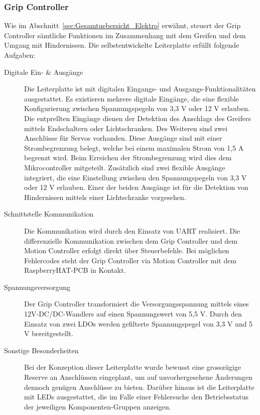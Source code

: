 \documentclass[main.tex]{subfiles} %
\begin{document}

\subsubsection{Grip Controller}
Wie im Abschnitt~\ref{sec:Gesamtuebersicht_Elektro} erwähnt, steuert der Grip
Controller sämtliche Funktionen im Zusammenhang mit dem Greifen und dem Umgang
mit Hindernissen. Die selbstentwickelte Leiterplatte erfüllt folgende Aufgaben:

\begin{description}
      \item[Digitale Ein- \& Ausgänge] Die Leiterplatte ist mit digitalen Eingangs- und
            Ausgangs-Funktionalitäten ausgestattet. Es existieren mehrere digitale
            Eingänge, die eine flexible Konfigurierung zwischen Spannungspegeln von 3,3 V
            oder 12 V erlauben. Die entprellten Eingänge dienen der Detektion des Anschlags
            des Greifers mittels Endschaltern oder Lichtschranken. Des Weiteren sind zwei
            Anschlüsse für Servos vorhanden. Diese Ausgänge sind mit einer Strombegrenzung
            belegt, welche bei einem maximalen Strom von 1,5 A begrenzt wird. Beim
            Erreichen der Strombegrenzung wird dies dem Mikrocontroller mitgeteilt.
            Zusätzlich sind zwei flexible Ausgänge integriert, die eine Einstellung
            zwischen den Spannungspegeln von 3,3 V oder 12 V erlauben. Einer der beiden
            Ausgänge ist für die Detektion von Hindernissen mittels einer Lichtschranke
            vorgesehen.

      \item[Schnittstelle Kommunikation] Die Kommunikation wird durch den Einsatz von UART
            realisiert. Die differenzielle Kommunikation zwischen dem Grip Controller und
            dem Motion Controller erfolgt direkt über Steuerbefehle. Bei möglichen
            Fehlercodes steht der Grip Controller via Motion Controller mit dem
            RaspberryHAT-PCB in Kontakt.

      \item[Spannungsversorgung] Der Grip Controller transformiert die Versorgungsspannung
            mittels eines 12V-DC/DC-Wandlers auf einen Spannungswert von 5,5 V. Durch den
            Einsatz von zwei LDOs werden gefilterte Spannungspegel von 3,3 V und 5 V
            bereitgestellt.

      \item[Sonstige Besonderheiten] Bei der Konzeption dieser Leiterplatte wurde bewusst
            eine grosszügige Reserve an Anschlüssen eingeplant, um auf unvorhergesehene
            Änderungen dennoch genügen Anschlüsse zu bieten. Darüber hinaus ist die
            Leiterplatte mit LEDs ausgestattet, die im Falle einer Fehlersuche den
            Betriebsstatus der jeweiligen Komponenten-Gruppen anzeigen.
\end{description}
\end{document}
